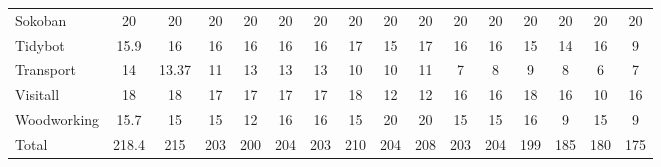 \begin{table}[htb]
\begin{tabular}{lccccccccccccccc}
Sokoban                  & 20                                 & 20              & 20              & 20              & 20              & 20                              & 20                    & 20                   & 20                   & 20                     & 20                     & 20                              & 20                    & 20                      & 20                      \\
Tidybot                  & 15.9                               & 16              & 16              & 16              & 16              & 16                              & 17                    & 15                   & 17                   & 16                     & 16                     & 15                              & 14                    & 16                      & 9                       \\
Transport                & 14                                 & 13.37           & 11              & 13              & 13              & 13                              & 10                    & 10                   & 11                   & 7                      & 8                      & 9                               & 8                     & 6                       & 7                       \\
Visitall                 & 18                                 & 18              & 17              & 17              & 17              & 17                              & 18                    & 12                   & 12                   & 16                     & 16                     & 18                              & 16                    & 10                      & 16                      \\
Woodworking              & 15.7                               & 15              & 15              & 12              & 16              & 16                              & 15                    & 20                   & 20                   & 15                     & 15                     & 16                              & 9                     & 15                      & 9                       \\ \hline
Total                    & 218.4                              & 215             & 203             & 200             & 204             & 203                             & 210                   & 204                  & 208                  & 203                    & 204                    & 199                             & 185                   & 180                     & 175                     \\ \hline
\end{tabular}
\label{tb_two}
\end{table}

